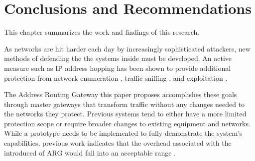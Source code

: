 \chapter{Conclusions and Recommendations}
\label{chp:conclusion}

\par This chapter summarizes the work and findings of this research. 

\begin{comment}
\lettrine{T}{here} are two distinct parts here:

\par Conclusions: Re-state what you have done, summarize the results that you got,
and summarize the key conclusions that you can draw from your results. All of
this is a summary of the entire thesis, and there should be absolutely nothing new
here that hasn’t already been covered in the previous chapters. (It will probably
be presented in a more concise form, however—don’t just cut-and-paste from
previous chapters).

\par Recommendations: Think of this as a description of what should be done in any
follow-on work (as if a student is picking up where you left off, and you need to
tell them what they could/should look at). I’ve found that a bulleted list of
recommendations often works well, where each bullet is a paragraph (or two)
describing a particular recommendation that you have. Don’t be afraid to point
out the shortcomings of your work, and describe what would need to be done to
overcome these shortcomings. (Doing so shows that you understand the limits of
your research, and comes off far better than trying to pretend that your research
has solved every problem, when it really hasn’t). Much of what is covered here
will have already been stated in the analysis of Chapter 4. However, it’s OK to
have some new concepts here that aren’t explicitly described elsewhere.
\end{comment}

\par As networks are hit harder each day by increasingly sophisticated attackers, new methods of defending the the systems inside must be developed. An active measure such as IP address hopping has been shown to provide additional protection from network enumeration \cite{NAH}, traffic sniffing \cite{BBNDYNAT}, and exploitation \cite{APOD}.

\par The Address Routing Gateway this paper proposes accomplishes these goals through master gateways that transform traffic without any changes needed to the networks they protect. Previous systems tend to either have a more limited protection scope or require broader changes to existing equipment and networks. While a prototype needs to be implemented to fully demonstrate the system's capabilities, previous work indicates that the overhead associated with the introduced of ARG would fall into an acceptable range \cite{NAH}.

